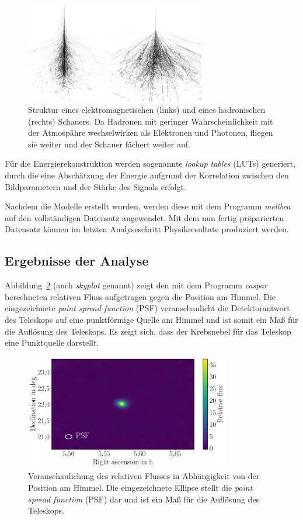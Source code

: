 \begin{figure}
  \centering
  \includegraphics[width=0.7\textwidth]{figures/gamma_hadron.png}
  \caption{Struktur eines elektromagnetischen (links) und eines hadronischen
  (rechts) Schauers. Da Hadronen mit geringer Wahrscheinlichkeit mit der
  Atmospähre wechselwirken als Elektronen und Photonen, fliegen sie weiter und
  der Schauer fächert weiter auf.}
  \label{fig:gamma_hadron}
\end{figure}

Für die Energierekonstruktion werden sogenannte \textit{lookup tables} (LUTs)
generiert, durch die eine Abschätzung der Energie aufgrund der Korrelation
zwischen den Bildparametern und der Stärke des Signals erfolgt.

Nachdem die Modelle erstellt wurden, werden diese mit dem Programm
\textit{melibea} auf den vollständigen Datensatz angewendet. Mit dem nun fertig
präparierten Datensatz können im letzten Analyseschritt Physikresultate
produziert werden.

\subsection{Ergebnisse der Analyse}

Abbildung~\ref{fig:skyplot} (auch \textit{skyplot} genannt) zeigt den mit dem
Programm \textit{caspar} berechneten relativen Fluss aufgetragen gegen die
Position am Himmel. Die eingezeichnete \textit{point spread function} (PSF)
veranschaulicht die Detektorantwort des Teleskops auf eine punktförmige Quelle
am Himmel und ist somit ein Maß für die Auflösung des Teleskops. Es zeigt sich,
dass der Krebsnebel für das Teleskop eine Punktquelle darstellt.

\begin{figure}[H]
  \centering
  \includegraphics[width=0.8\textwidth]{figures/caspar_flux_skymap.pdf}
  \caption{Veranschaulichung des relativen Flusses in Abhängigkeit von der
  Position am Himmel. Die eingezeichnete Ellipse stellt die
  \textit{point spread function} (PSF) dar und ist ein Maß für die Auflösung des
  Teleskops.}
  \label{fig:skyplot}
\end{figure}

